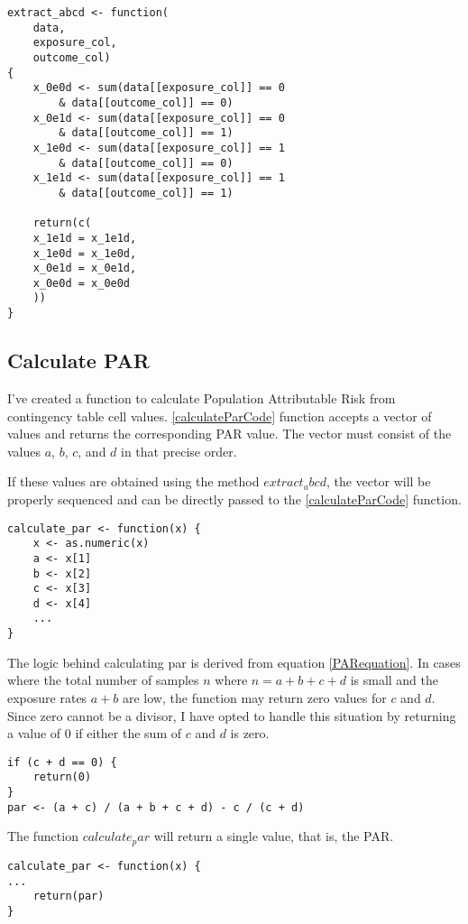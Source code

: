 \begin{lstlisting}
extract_abcd <- function(
    data,
    exposure_col,
    outcome_col) 
{
    x_0e0d <- sum(data[[exposure_col]] == 0 
        & data[[outcome_col]] == 0)
    x_0e1d <- sum(data[[exposure_col]] == 0 
        & data[[outcome_col]] == 1)
    x_1e0d <- sum(data[[exposure_col]] == 1 
        & data[[outcome_col]] == 0)
    x_1e1d <- sum(data[[exposure_col]] == 1 
        & data[[outcome_col]] == 1)

    return(c(
    x_1e1d = x_1e1d,
    x_1e0d = x_1e0d,
    x_0e1d = x_0e1d,
    x_0e0d = x_0e0d
    ))
}
\end{lstlisting}\label{extractABCDcode}

\subsection{Calculate PAR}
I've created a function to calculate Population Attributable Risk from contingency table cell values. \ref{calculateParCode} function accepts a vector of values and returns the corresponding PAR value. The vector must consist of the values $a$, $b$, $c$, and $d$ in that precise order.

If these values are obtained using the method $extract_abcd$, the vector will be properly sequenced and can be directly passed to the \ref{calculateParCode} function.

\begin{lstlisting}
calculate_par <- function(x) {
    x <- as.numeric(x)
    a <- x[1]
    b <- x[2]
    c <- x[3]
    d <- x[4]
    ...
}
\end{lstlisting}\label{calculateParCode}

The logic behind calculating par is derived from equation \ref{PARequation}. In cases where the total number of samples $n$ where $n = a + b + c + d$ is small and the exposure rates $a + b$ are low, the function may return zero values for $c$ and $d$. Since zero cannot be a divisor, I have opted to handle this situation by returning a value of 0 if either the sum of $c$ and $d$ is zero.

\begin{lstlisting}
if (c + d == 0) {
    return(0)
}
par <- (a + c) / (a + b + c + d) - c / (c + d)
\end{lstlisting}

The function $calculate_par$ will return a single value, that is, the PAR.

\begin{lstlisting}
calculate_par <- function(x) {
...
    return(par)
}
\end{lstlisting}


